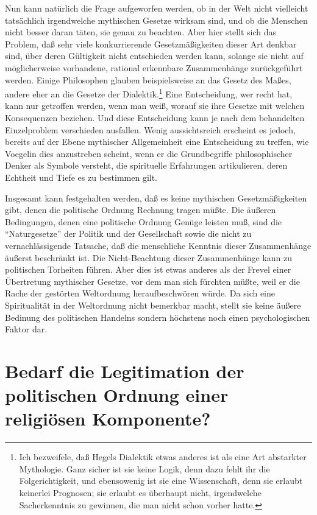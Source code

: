 Nun kann natürlich die Frage aufgeworfen werden, ob in der Welt nicht
vielleicht tatsächlich irgendwelche mythischen Gesetze wirksam sind, und
ob die Menschen nicht besser daran täten, sie genau zu beachten. Aber
hier stellt sich das Problem, daß sehr viele konkurrierende
Gesetzmäßigkeiten dieser Art denkbar sind, über deren Gültigkeit nicht
entschieden werden kann, solange sie nicht auf möglicherweise
vorhandene, rational erkennbare Zusammenhänge zurückgeführt werden.
Einige Philosophen glauben beispielsweise an das Gesetz des Maßes,
andere eher an die Gesetze der Dialektik.\footnote{Ich bezweifele, daß
  Hegels Dialektik etwas anderes ist als eine Art abstarkter Mythologie.
  Ganz sicher ist sie keine Logik, denn dazu fehlt ihr die
  Folgerichtigkeit, und ebensowenig ist sie eine Wissenschaft, denn sie
  erlaubt keinerlei Prognosen; sie erlaubt es überhaupt nicht,
  irgendwelche Sacherkenntnis zu gewinnen, die man nicht schon vorher
  hatte.} Eine Entscheidung, wer recht hat, kann nur getroffen werden,
wenn man weiß, worauf sie ihre Gesetze mit welchen Konsequenzen
beziehen. Und diese Entscheidung kann je nach dem behandelten
Einzelproblem verschieden ausfallen. Wenig aussichtsreich erscheint es
jedoch, bereits auf der Ebene mythischer Allgemeinheit eine Entscheidung
zu treffen, wie Voegelin dies anzustreben scheint, wenn er die
Grundbegriffe philosophischer Denker als Symbole versteht, die
spirituelle Erfahrungen artikulieren, deren Echtheit und Tiefe es zu
bestimmen gilt.

Insgesamt kann festgehalten werden, daß es keine mythischen Gesetzmäßigkeiten
gibt, denen die politische Ordnung Rechnung tragen müßte. Die äußeren
Bedingungen, denen eine politische Ordnung Genüge leisten muß, sind die
"`Naturgesetze"' der Politik und der Gesellschaft sowie die nicht zu
vernachlässigende Tatsache, daß die menschliche Kenntnis dieser Zusammenhänge
äußerst beschränkt ist. Die Nicht-Beachtung dieser Zusammenhänge kann zu
politischen Torheiten führen. Aber dies ist etwas anderes als der Frevel einer
Übertretung mythischer Gesetze, vor dem man sich fürchten müßte, weil er die
Rache der gestörten Weltordnung heraufbeschwören würde. Da sich eine
Spiritualität in der Weltordnung nicht bemerkbar macht, stellt sie keine
äußere Bedinung des politischen Handelns sondern höchstens noch einen
psychologischen Faktor dar.

\section{Bedarf die Legitimation der politischen Ordnung einer religiösen Komponente?} 

